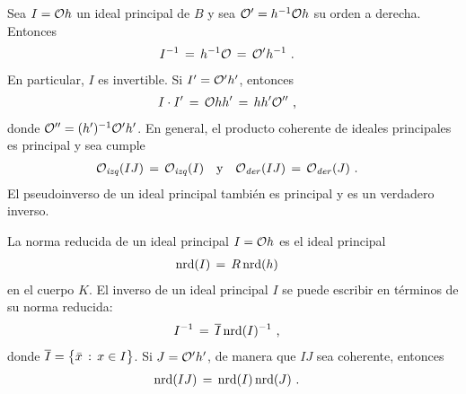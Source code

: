 Sea $I=\cal{O}h$ un ideal principal de $B$ y sea $\cal{O}'=h^{-1}\cal{O}h$ su
orden a derecha. Entonces
\begin{align*}
	I^{-1} & \,=\,h^{-1}\cal{O}\,=\,\cal{O}'h^{-1}
	\text{ .}
\end{align*}
%
En particular, $I$ es invertible. Si $I'=\cal{O}'h'$, entonces
\begin{align*}
	I\cdot I' & \,=\,\cal{O}hh'\,=\,hh'\cal{O}''
	\text{ ,}
\end{align*}
%
donde $\cal{O}''=(h')^{-1}\cal{O}'h'$. En general, el producto coherente de
ideales principales es principal y sea cumple
\begin{align*}
	\Oizq(IJ) \,=\,\Oizq(I) & \quad\text{y}\quad
		\Oder(IJ) \,=\,\Oder(J)
	\text{ .}
\end{align*}
%
El pseudoinverso de un ideal principal tambi\'{e}n es principal y es un
verdadero inverso.

La norma reducida de un ideal principal $I=\cal{O}h$ es el ideal principal
\begin{align*}
	\nrd(I) & \,=\,R\,\nrd(h)
\end{align*}
%
en el cuerpo $K$. El inverso de un ideal principal $I$ se puede escribir en
t\'{e}rminos de su norma reducida:
\begin{align*}
	I^{-1} & \,=\,\lconj{I}\,\nrd(I)^{-1}
	\text{ ,}
\end{align*}
%
donde $\lconj{I}=\big\{\conj{x}\,:\,x\in I\big\}$.
Si $J=\cal{O}'h'$, de manera que $IJ$ sea coherente, entonces
\begin{align*}
	\nrd(IJ) & \,=\,\nrd(I)\,\nrd(J)
	\text{ .}
\end{align*}
%

